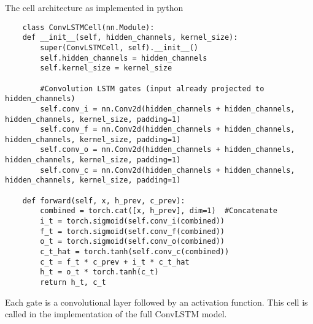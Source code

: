\documentclass[a4paper,12pt]{article}
\begin{document}
  The cell architecture as implemented in python
  \begin{lstlisting}
    class ConvLSTMCell(nn.Module):
    def __init__(self, hidden_channels, kernel_size):
        super(ConvLSTMCell, self).__init__()
        self.hidden_channels = hidden_channels
        self.kernel_size = kernel_size

        #Convolution LSTM gates (input already projected to hidden_channels)
        self.conv_i = nn.Conv2d(hidden_channels + hidden_channels, hidden_channels, kernel_size, padding=1)
        self.conv_f = nn.Conv2d(hidden_channels + hidden_channels, hidden_channels, kernel_size, padding=1)
        self.conv_o = nn.Conv2d(hidden_channels + hidden_channels, hidden_channels, kernel_size, padding=1)
        self.conv_c = nn.Conv2d(hidden_channels + hidden_channels, hidden_channels, kernel_size, padding=1)

    def forward(self, x, h_prev, c_prev):
        combined = torch.cat([x, h_prev], dim=1)  #Concatenate
        i_t = torch.sigmoid(self.conv_i(combined))
        f_t = torch.sigmoid(self.conv_f(combined))
        o_t = torch.sigmoid(self.conv_o(combined))
        c_t_hat = torch.tanh(self.conv_c(combined))
        c_t = f_t * c_prev + i_t * c_t_hat
        h_t = o_t * torch.tanh(c_t)
        return h_t, c_t
  \end{lstlisting}
  Each gate is a convolutional layer followed by an activation function. This cell is called in the implementation of the full ConvLSTM model.
\end{document}
